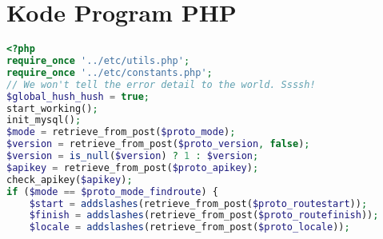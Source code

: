 \singlespacing 

\chapter{Kode Program PHP}
\label{app:A}

\begin{lstlisting}[language=PHP,basicstyle=\tiny,caption=handle.php,label={lst:handle.php}]
<?php
require_once '../etc/utils.php';
require_once '../etc/constants.php';
// We won't tell the error detail to the world. Ssssh!
$global_hush_hush = true;
start_working();
init_mysql();
$mode = retrieve_from_post($proto_mode);
$version = retrieve_from_post($proto_version, false);
$version = is_null($version) ? 1 : $version;
$apikey = retrieve_from_post($proto_apikey);
check_apikey($apikey);
if ($mode == $proto_mode_findroute) {
	$start = addslashes(retrieve_from_post($proto_routestart));
	$finish = addslashes(retrieve_from_post($proto_routefinish));
	$locale = addslashes(retrieve_from_post($proto_locale));
	

\end{lstlisting}
